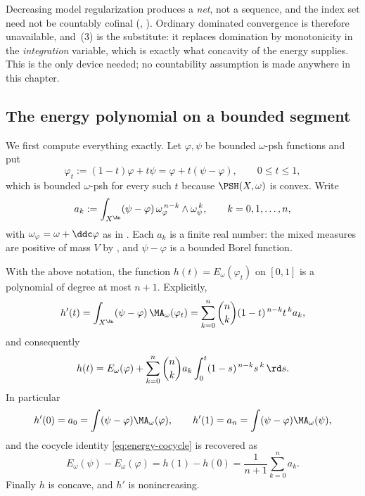 \begin{remark}
\label{rem:ch27-nets-here}
Decreasing model regularization 
produces a \emph{net}, not a sequence, and the index set need not be
countably cofinal
(, ).  Ordinary
dominated convergence is therefore unavailable, and
\,(3) is the substitute: it replaces domination
by monotonicity in the \emph{integration} variable, which is exactly what
concavity of the energy supplies.  This is the only device needed; no
countability assumption is made anywhere in this chapter.
\end{remark}

\subsection{The energy polynomial on a bounded segment}
\label{sec:ch27-energy-polynomial}

We first compute everything exactly.  Let \(\varphi,\psi\) be bounded
\(\omega\)-psh functions and put
\[
 \varphi_t:=(1-t)\varphi+t\psi=\varphi+t(\psi-\varphi),
 \qquad 0\leq t\leq1,
\]
which is bounded \(\omega\)-psh for every such \(t\) because
\(\PSH(X,\omega)\) is convex.  Write
\begin{equation}\label{eq:ch27-mixed-coefficients}
 a_k:=\int_{X^{\An}}(\psi-\varphi)\,
       \omega_\varphi^{\,n-k}\wedge\omega_\psi^{\,k},
 \qquad k=0,1,\dots,n,
\end{equation}
with \(\omega_\varphi=\omega+\ddc\varphi\) as in .
Each \(a_k\) is a finite real number: the mixed measures are positive of
mass \(V\) by , and \(\psi-\varphi\) is a
bounded Borel function.

\begin{proposition}
\label{prop:ch27-energy-polynomial}
With the above notation, the function
\(h(t)=E_\omega(\varphi_t)\) on \([0,1]\) is a polynomial of degree at most
\(n+1\).  Explicitly,
\begin{equation}\label{eq:ch27-energy-derivative-binomial}
 h'(t)=\int_{X^{\An}}(\psi-\varphi)\,\MA_\omega(\varphi_t)
 =\sum_{k=0}^n\binom nk(1-t)^{\,n-k}t^{\,k}a_k ,
\end{equation}
and consequently
\begin{equation}\label{eq:ch27-energy-integral-form}
 h(t)=E_\omega(\varphi)+\sum_{k=0}^n\binom nk a_k
      \int_0^t(1-s)^{\,n-k}s^{\,k}\,\rd s .
\end{equation}
In particular
\begin{equation}\label{eq:ch27-endpoint-derivatives}
 h'(0)=a_0=\int(\psi-\varphi)\MA_\omega(\varphi),
 \qquad
 h'(1)=a_n=\int(\psi-\varphi)\MA_\omega(\psi),
\end{equation}
and the cocycle identity \eqref{eq:energy-cocycle} is recovered as
\begin{equation}\label{eq:ch27-cocycle-recovered}
 E_\omega(\psi)-E_\omega(\varphi)=h(1)-h(0)
 =\frac1{n+1}\sum_{k=0}^na_k .
\end{equation}
Finally \(h\) is concave, and \(h'\) is nonincreasing.
\end{proposition}

